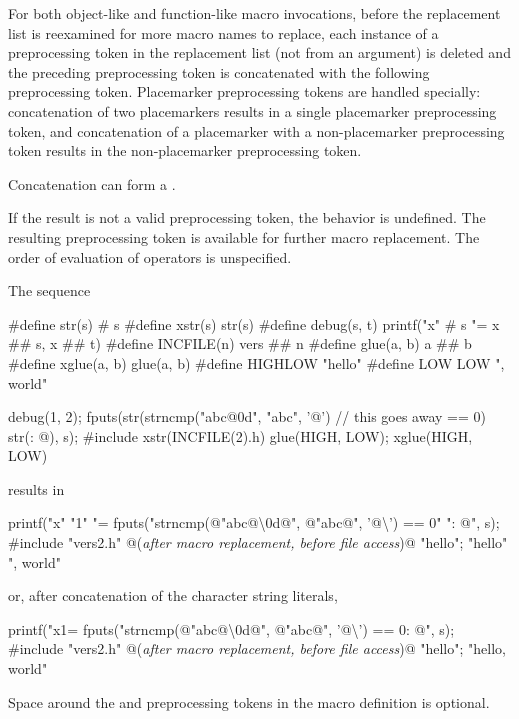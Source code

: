 \pnum
For both object-like and function-like macro invocations, before the
replacement list is reexamined for more macro names to replace,
each instance of a
\tcode{\#\#}
preprocessing token in the replacement list
(not from an argument) is deleted and the
preceding preprocessing token is concatenated
with the following preprocessing token.
Placemarker preprocessing tokens are handled specially: concatenation
of two placemarkers results in a single placemarker preprocessing token, and
concatenation of a placemarker with a non-placemarker preprocessing token results
in the non-placemarker preprocessing token.
\begin{note}
Concatenation can form
a .
\end{note}
If the result is not a valid preprocessing token,
the behavior is undefined.
The resulting preprocessing token is available for further macro replacement.
The order of evaluation of
\tcode{\#\#}
operators is unspecified.

\pnum
\begin{example}
The sequence
\begin{codeblock}
#define str(s)      # s
#define xstr(s)     str(s)
#define debug(s, t) printf("x" # s "= %
               x ## s, x ## t)
#define INCFILE(n)  vers ## n
#define glue(a, b)  a ## b
#define xglue(a, b) glue(a, b)
#define HIGHLOW     "hello"
#define LOW         LOW ", world"

debug(1, 2);
fputs(str(strncmp("abc@\textbackslash@0d", "abc", '@')        // this goes away
    == 0) str(: @\atsign\textbackslash@n), s);
#include xstr(INCFILE(2).h)
glue(HIGH, LOW);
xglue(HIGH, LOW)
\end{codeblock}
results in
\begin{codeblock}
printf("x" "1" "= %
fputs("strncmp(@\textbackslash@"abc@\textbackslash\textbackslash@0d@\textbackslash@", @\textbackslash@"abc@\textbackslash@", '@\textbackslash{}') == 0" ": @\atsign\textbackslash@n", s);
#include "vers2.h"      @\textrm{(\textit{after macro replacement, before file access})}@
"hello";
"hello" ", world"
\end{codeblock}
or, after concatenation of the character string literals,
\begin{codeblock}
printf("x1= %
fputs("strncmp(@\textbackslash@"abc@\textbackslash\textbackslash@0d@\textbackslash@", @\textbackslash@"abc@\textbackslash@", '@\textbackslash{}') == 0: @\atsign\textbackslash@n", s);
#include "vers2.h"      @\textrm{(\textit{after macro replacement, before file access})}@
"hello";
"hello, world"
\end{codeblock}

Space around the \tcode{\#} and \tcode{\#\#} preprocessing tokens in the macro definition
is optional.
\end{example}

